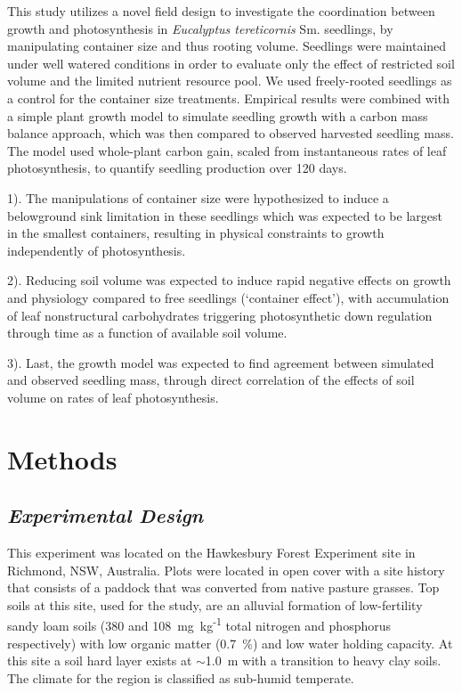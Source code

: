 \documentclass[a4paper]{article}\usepackage[]{graphicx}\usepackage[]{color}
\begin{document}
This study utilizes a novel field design to investigate the coordination between growth and photosynthesis in \textit{Eucalyptus tereticornis} Sm. seedlings, by manipulating container size and thus rooting volume. Seedlings were maintained under well watered conditions in order to evaluate only the effect of restricted soil volume and the limited nutrient resource pool. We used freely-rooted seedlings as a control for the container size treatments.  Empirical results were combined with a simple plant growth model to simulate seedling growth with a carbon mass balance approach, which was then compared to observed harvested seedling mass.  The model used whole-plant carbon gain, scaled from instantaneous rates of leaf photosynthesis, to quantify seedling production over 120 days. 

1). The manipulations of container size were hypothesized to induce a belowground sink limitation in these seedlings which was expected to be largest in the smallest containers, resulting in physical constraints to growth independently of photosynthesis.

2). Reducing soil volume was expected to induce rapid negative effects on growth and physiology compared to free seedlings (‘container effect’), with accumulation of leaf nonstructural carbohydrates triggering photosynthetic down regulation through time as a function of available soil volume.

3). Last, the growth model was expected to find agreement between simulated and observed seedling mass, through direct correlation of the effects of soil volume on rates of leaf photosynthesis.

\section*{Methods}

\subsection*{\textit{Experimental Design}}

This experiment was located on the Hawkesbury Forest Experiment site in Richmond, NSW, Australia. Plots were located in open cover with a site history that consists of a paddock that was converted from native pasture grasses. Top soils at this site, used for the study, are an alluvial formation of low-fertility sandy loam soils (380 and 108~mg~kg\textsuperscript{-1} total nitrogen and phosphorus respectively) with low organic matter (0.7~\%) and low water holding capacity. At this site a soil hard layer exists at $\sim$1.0~m with a transition to heavy clay soils. The climate for the region is classified as sub-humid temperate. 
\end{document}
